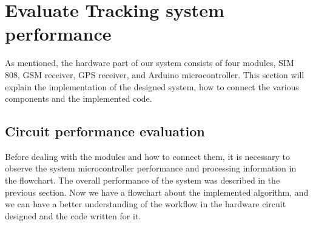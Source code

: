 \section{Evaluate Tracking system performance}
As mentioned, the hardware part of our system consists of four modules, SIM 808, GSM receiver, GPS receiver, and Arduino microcontroller. This section will explain the implementation of the designed system, how to connect the various components and the implemented code.
\subsection{Circuit performance evaluation}
Before dealing with the modules and how to connect them, it is necessary to observe the system microcontroller performance and processing information in the flowchart. The overall performance of the system was described in the previous section. Now we have a flowchart about the implemented algorithm, and we can have a better understanding of the workflow in the hardware circuit designed and the code written for it.\\